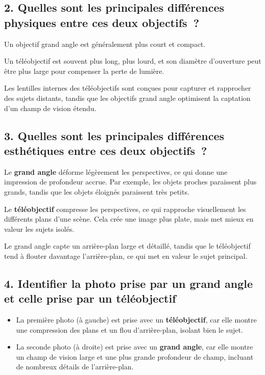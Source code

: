 \documentclass[answers]{exam}
\begin{document}
\subsection*{2. Quelles sont les principales différences physiques entre ces deux objectifs ?}

\begin{compactenum}
    \item Un objectif grand angle est généralement plus court et compact.
    \item Un téléobjectif est souvent plus long, plus lourd, et son diamètre d'ouverture peut être plus large pour compenser la perte de lumière.
    \item Les lentilles internes des téléobjectifs sont conçues pour capturer et rapprocher des sujets distants, tandis que les objectifs grand angle optimisent la captation d'un champ de vision étendu.
\end{compactenum}

\subsection*{3. Quelles sont les principales différences esthétiques entre ces deux objectifs ?}

\begin{compactenum}
    \item Le \textbf{grand angle} déforme légèrement les perspectives, ce qui donne une impression de profondeur accrue. Par exemple, les objets proches paraissent plus grands, tandis que les objets éloignés paraissent très petits.
    \item Le \textbf{téléobjectif} compresse les perspectives, ce qui rapproche visuellement les différents plans d'une scène. Cela crée une image plus plate, mais met mieux en valeur les sujets isolés.
    \item Le grand angle capte un arrière-plan large et détaillé, tandis que le téléobjectif tend à flouter davantage l'arrière-plan, ce qui met en valeur le sujet principal.
\end{compactenum}

\subsection*{4. Identifier la photo prise par un grand angle et celle prise par un téléobjectif}

\begin{itemize}
    \item La première photo (à gauche) est prise avec un \textbf{téléobjectif}, car elle montre une compression des plans et un flou d'arrière-plan, isolant bien le sujet.
    \item La seconde photo (à droite) est prise avec un \textbf{grand angle}, car elle montre un champ de vision large et une plus grande profondeur de champ, incluant de nombreux détails de l'arrière-plan.
\end{itemize}
\end{document}
